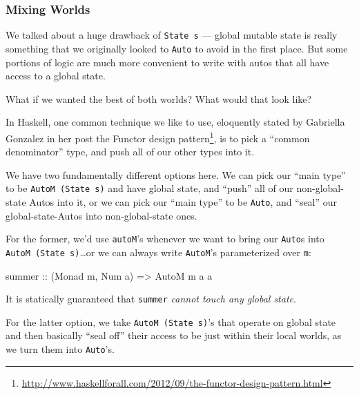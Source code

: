 \documentclass[]{article}
\newenvironment{Shaded}{}{}
\newcommand{\DataTypeTok}[1]{\textcolor[rgb]{0.56,0.13,0.00}{#1}}
\newcommand{\NormalTok}[1]{#1}
\newcommand{\OtherTok}[1]{\textcolor[rgb]{0.00,0.44,0.13}{#1}}
\renewcommand{\href}[2]{#2\footnote{\url{#1}}}
\begin{document}
\subsubsection{Mixing Worlds}\label{mixing-worlds}

We talked about a huge drawback of \texttt{State\ s} --- global mutable state is
really something that we originally looked to \texttt{Auto} to avoid in the
first place. But some portions of logic are much more convenient to write with
autos that all have access to a global state.

What if we wanted the best of both worlds? What would that look like?

In Haskell, one common technique we like to use, eloquently stated by Gabriella
Gonzalez in her post
\href{http://www.haskellforall.com/2012/09/the-functor-design-pattern.html}{the
Functor design pattern}, is to pick a ``common denominator'' type, and push all
of our other types into it.

We have two fundamentally different options here. We can pick our ``main type''
to be \texttt{AutoM\ (State\ s)} and have global state, and ``push'' all of our
non-global-state Autos into it, or we can pick our ``main type'' to be
\texttt{Auto}, and ``seal'' our global-state-Autos into non-global-state ones.

For the former, we'd use \texttt{autoM}'s whenever we want to bring our
\texttt{Auto}s into \texttt{AutoM\ (State\ s)}\ldots or we can always write
\texttt{AutoM}'s parameterized over \texttt{m}:

\begin{Shaded}
\begin{Highlighting}[]
\OtherTok{summer ::}\NormalTok{ (}\DataTypeTok{Monad}\NormalTok{ m, }\DataTypeTok{Num}\NormalTok{ a) }\OtherTok{=\textgreater{}} \DataTypeTok{AutoM}\NormalTok{ m a a}
\end{Highlighting}
\end{Shaded}

It is statically guaranteed that \texttt{summer} \emph{cannot touch any global
state}.

For the latter option, we take \texttt{AutoM\ (State\ s)}'s that operate on
global state and then basically ``seal off'' their access to be just within
their local worlds, as we turn them into \texttt{Auto}'s.
\end{document}
